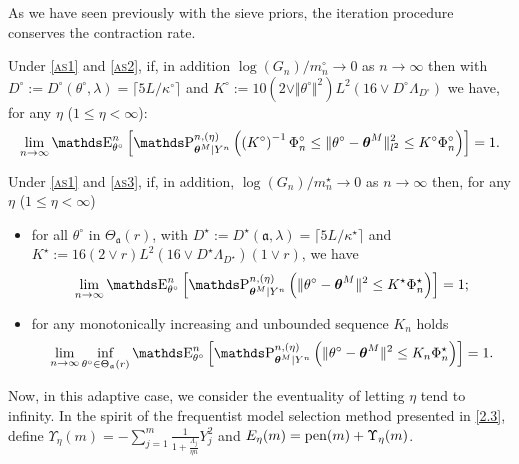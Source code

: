 As we have seen previously with the sieve priors, the iteration procedure conserves the contraction rate.

\begin{cor}\label{cor3}
Under \textsc{\cref{as1}} and \textsc{\cref{as2}}, if, in addition $\log(G_{n})/m_{n}^{\circ} \rightarrow 0$ as $n \rightarrow \infty$ then with $D^{\circ} := D^{\circ}(\theta^{\circ}, \lambda) = \lceil 5 L/\kappa^{\circ} \rceil$ and $K^{\circ} := 10(2 \vee \Vert \theta^{\circ} \Vert^{2})L^{2}(16 \vee D^{\circ} \Lambda_{D^{\circ}})$ we have, for any $\eta$ ($1 \leq \eta < \infty$):
\[\lim\limits_{n \rightarrow \infty} \E_{\theta^{\circ}}^{n}\left[\P_{\boldsymbol{\theta}^{M} \vert Y^{n}}^{n, (\eta)} \left(\left(K^{\circ}\right)^{-1} \Phi_{n}^{\circ} \leq \Vert \theta^{\circ} - \boldsymbol{\theta}^{M} \Vert_{l^{2}}^{2} \leq K^{\circ} \Phi_{n}^{\circ}\right)\right] = 1.\]
\end{cor}

\begin{cor}\label{cor4}
Under \textsc{\cref{as1}} and \textsc{\cref{as3}}, if, in addition, $\log(G_{n})/m_{n}^{\star} \rightarrow 0$ as $n \rightarrow \infty$ then, for any $\eta$ ($1 \leq \eta < \infty$)
\begin{itemize}
\item for all $\theta^{\circ}$ in $\Theta_{\mathfrak{a}}(r)$, with $D^{\star} := D^{\star}(\mathfrak{a}, \lambda) = \lceil 5 L/\kappa^{\star} \rceil$ and $K^{\star} := 16\left(2 \vee r\right)L^{2}\left(16 \vee D^{\star} \Lambda_{D^{\star}}\right)\left(1 \vee r \right)$, we have
\[\lim\limits_{n \rightarrow \infty} \E_{\theta^{\circ}}^{n}\left[\P_{\boldsymbol{\theta}^{M} \vert Y^{n}}^{n, (\eta)}\left(\Vert \theta^{\circ} - \boldsymbol{\theta}^{M} \Vert^{2} \leq K^{\star} \Phi_{n}^{\star}\right)\right] =1;\]
\item for any monotonically increasing and unbounded sequence $K_{n}$ holds
\[\lim\limits_{n \rightarrow \infty} \inf\limits_{\theta^{\circ} \in \Theta_{\mathfrak{a}}(r)} \E_{\theta^{\circ}}^{n}\left[\P_{\boldsymbol{\theta}^{M} \vert Y^{n}}^{n, (\eta)}\left(\Vert \theta^{\circ} - \boldsymbol{\theta}^{M} \Vert^{2} \leq K_{n} \Phi_{n}^{\star}\right)\right] =1.\]
\end{itemize}
\end{cor}


Now, in this adaptive case, we consider the eventuality of letting $\eta$ tend to infinity.
In the spirit of the frequentist model selection method presented in \textsc{\cref{2.3}}, define $\Upsilon_{\eta}(m) = - \sum\limits_{j = 1}^{m} \frac{1}{1 + \frac{\Lambda_{j}}{\eta n}} Y_{j}^{2}$ and $E_{\eta}(m) = \operatorname{pen}(m) + \Upsilon_{\eta}(m)$.

